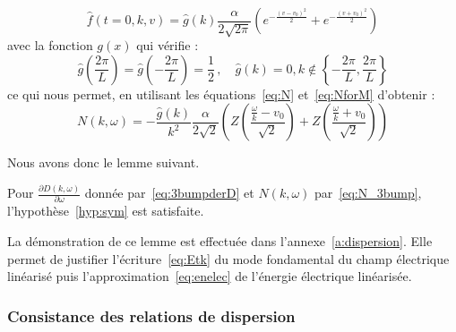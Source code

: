 $$
  \hat{f}(t=0,k,v) = \hat{g}(k) \frac{\alpha}{2\sqrt{2\pi}}\left( e^{-\frac{(v-v_0)^2}{2}} + e^{-\frac{(v+v_0)^2}{2}} \right) 
$$
avec la fonction $g(x)$ qui vérifie :
$$ 
  \hat{g}\left(\frac{2\pi}{L}\right) = \hat{g}\left(-\frac{2\pi}{L}\right) = \frac{1}{2}\,,\quad \hat{g}(k) = 0, k\notin\left\{-\frac{2\pi}{L} ,\frac{2\pi}{L} \right\}
$$
ce qui nous permet, en utilisant les équations~\eqref{eq:N} et~\eqref{eq:NforM} d'obtenir :
\begin{equation}
  N(k,\omega) = -\frac{\hat{g}(k)}{k^2}\frac{\alpha}{2\sqrt{2}}\left( Z\left(\frac{\frac{\omega}{k}-v_0}{\sqrt{2}}\right) + Z\left(\frac{\frac{\omega}{k}+v_0}{\sqrt{2}}\right) \right)
  \label{eq:N_3bump}
\end{equation}

Nous avons donc le lemme suivant.
\begin{lemma}
  Pour $\frac{\partial D(k,\omega)}{\partial\omega}$ donnée par~\eqref{eq:3bumpderD} et $N(k,\omega)$ par~\eqref{eq:N_3bump}, l'hypothèse~\ref{hyp:sym} est satisfaite.
  \label{lemme:hypcascin}
\end{lemma}

La démonstration de ce lemme est effectuée dans l'annexe~\ref{a:dispersion}. Elle permet de justifier l'écriture~\eqref{eq:Etk} du mode fondamental du champ électrique linéarisé puis l'approximation~\eqref{eq:enelec} de l'énergie électrique linéarisée. 

\subsubsection{Consistance des relations de dispersion}

